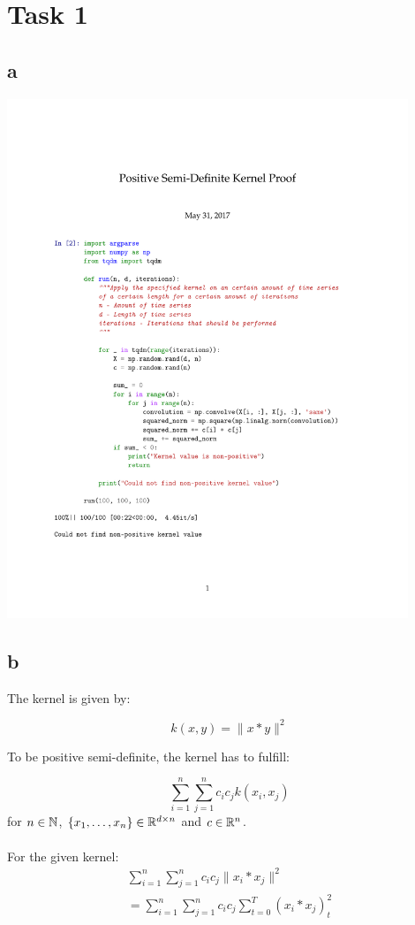 \section*{Task 1}

\subsection*{a}
\includegraphics[clip, trim=0.5cm 2.5cm 0.5cm 4cm, width=0.90\textwidth]{KernelProof.pdf}

\subsection*{b}

The kernel is given by:

\begin{equation}
    k(x, y) = \lVert x * y \rVert ^ 2
\end{equation}

To be positive semi-definite, the kernel has to fulfill:

\begin{equation}
    \sum_{i=1}^n \sum_{j=1}^n c_i c_j k(x_i, x_j)
\end{equation}
for $n \in \mathbb{N}$, $\{x_1, \ldots, x_n\} \in \mathbb{R}^{d \times n} $ and $c \in \mathbb{R}^n$.
\\
\\
For the given kernel:
\begin{align}
    \sum_{i=1}^n \sum_{j=1}^n c_i c_j \lVert x_i * x_j \rVert ^ 2  \\
    = \sum_{i=1}^n \sum_{j=1}^n c_i c_j \sum_{t=0}^T (x_i * x_j)_t^2  \\
\end{align}

